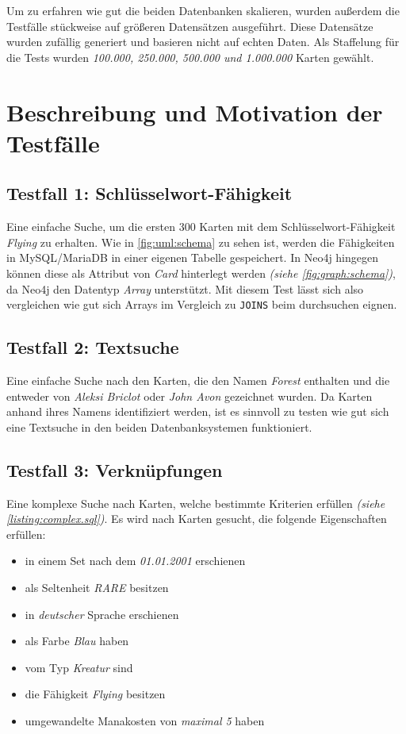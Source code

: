 Um zu erfahren wie gut die beiden Datenbanken skalieren, wurden außerdem die Testfälle stückweise auf größeren Datensätzen ausgeführt. Diese Datensätze wurden zufällig generiert und basieren nicht auf echten Daten. Als Staffelung für die Tests wurden \emph{100.000, 250.000, 500.000 und 1.000.000} Karten gewählt.

\section{Beschreibung und Motivation der Testfälle}

\subsection{Testfall 1: Schlüsselwort-Fähigkeit}
Eine einfache Suche, um die ersten 300 Karten mit dem Schlüsselwort-Fähigkeit \emph{Flying} zu erhalten. Wie in \autoref{fig:uml:schema} zu sehen ist, werden die Fähigkeiten in MySQL/MariaDB in einer eigenen Tabelle gespeichert. In Neo4j hingegen können diese als Attribut von \emph{Card} hinterlegt werden \emph{(siehe \autoref{fig:graph:schema})}, da Neo4j den Datentyp \emph{Array} unterstützt. Mit diesem Test lässt sich also vergleichen wie gut sich Arrays im Vergleich zu \verb|JOINS| beim durchsuchen eignen.
    
\subsection{Testfall 2: Textsuche}
Eine einfache Suche nach den Karten, die den Namen \emph{Forest} enthalten und die entweder von \emph{Aleksi Briclot} oder \emph{John Avon} gezeichnet wurden. Da Karten anhand ihres Namens identifiziert werden, ist es sinnvoll zu testen wie gut sich eine Textsuche in den beiden Datenbanksystemen funktioniert.

\subsection{Testfall 3: Verknüpfungen}
Eine komplexe Suche nach Karten, welche bestimmte Kriterien erfüllen \emph{(siehe \ref{listing:complex.sql})}. Es wird nach Karten gesucht, die folgende Eigenschaften erfüllen:
\begin{itemize}
    \item in einem Set nach dem \emph{01.01.2001} erschienen
    \item als Seltenheit \emph{RARE} besitzen
    \item in \emph{deutscher} Sprache erschienen
    \item als Farbe \emph{Blau} haben
    \item vom Typ \emph{Kreatur} sind
    \item die Fähigkeit \emph{Flying} besitzen
    \item umgewandelte Manakosten von \emph{maximal 5} haben
 \end{itemize} 

